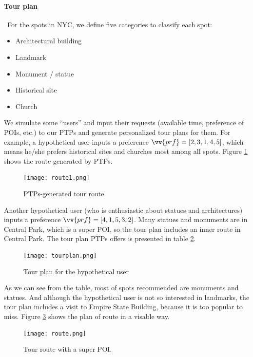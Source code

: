\documentclass{mcmthesis}
\begin{document}
  \paragraph{Tour plan} \
  For the spots in NYC, we define five categories to classify each spot: \par
  \begin{itemize}
    \item Architectural building
    \item Landmark
    \item Monument / statue
    \item Historical site
    \item Church
  \end{itemize}
  We simulate some ``users'' and input their requests (available time, preference of POIs, etc.) to our PTPs and generate personalized tour plans for them. For example, a hypothetical user inputs a preference $\vv{prf} = [2,3,1,4,5]$, which means he/she prefers historical sites and churches most among all spots. Figure \ref{fig:route1} shows the route generated by PTPs.\par
  \begin{figure}[h]
    \centering
    \texttt{[image: route1.png]}
    \caption{PTPs-generated tour route.}
    \label{fig:route1}
  \end{figure}
  Another hypothetical user (who is enthusiastic about statues and architectures) inputs a preference $\vv{prf} = [4, 1, 5, 3, 2]$. Many statues and monuments are in Central Park, which is a super POI, so the tour plan includes an inner route in Central Park. The tour plan PTPs offers is presented in table \ref{fig:table}.
  \begin{figure}[h]
    \centering
    \texttt{[image: tourplan.png]}
    \caption{Tour plan for the hypothetical user}
    \label{fig:table}
  \end{figure}
  As we can see from the table, most of spots recommended are monuments and statues. And although the hypothetical user is not so interested in landmarks, the tour plan includes a visit to Empire State Building, because it is too popular to miss. Figure \ref{fig:route} shows the plan of route in a visable way.
  \begin{figure}[h]
    \centering
    \texttt{[image: route.png]}
    \caption{Tour route with a super POI.}
    \label{fig:route}
  \end{figure}
\end{document}
